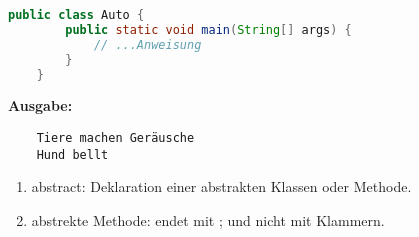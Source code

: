 \documentclass{article}
\begin{document}
\begin{lstlisting}[language=Java, caption={Main-Methode},label={lst:java_example}, mathescape=true]
    public class Auto {
        public static void main(String[] args) {
            // ...Anweisung
        }
    }
\end{lstlisting}

\textbf{Ausgabe:} \newline
\begin{verbatim}
    Tiere machen Geräusche
    Hund bellt
    \end{verbatim}
\begin{enumerate}
    \item abstract: Deklaration einer abstrakten Klassen oder Methode.
    \item abstrekte Methode: endet mit ; und nicht mit Klammern.
\end{enumerate}
\end{document}
